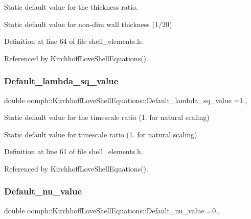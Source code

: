 Static default value for the thickness ratio. 

Static default value for non-\/dim wall thickness (1/20) 

Definition at line 64 of file shell\+\_\+elements.\+h.



Referenced by Kirchhoff\+Love\+Shell\+Equations().

\mbox{\label{classoomph_1_1KirchhoffLoveShellEquations_a62a599a88cfaa4a6b1c67eee80fb2d8b}} 
\subsubsection{\texorpdfstring{Default\+\_\+lambda\+\_\+sq\+\_\+value}{Default\_lambda\_sq\_value}}
{\footnotesize\ttfamily double oomph\+::\+Kirchhoff\+Love\+Shell\+Equations\+::\+Default\+\_\+lambda\+\_\+sq\+\_\+value =1.\hspace{0.3cm}{\ttfamily [static]}, {\ttfamily [private]}}



Static default value for the timescale ratio (1. for natural scaling) 

Static default value for timescale ratio (1. for natural scaling) 

Definition at line 61 of file shell\+\_\+elements.\+h.



Referenced by Kirchhoff\+Love\+Shell\+Equations().

\mbox{\label{classoomph_1_1KirchhoffLoveShellEquations_aaf47c41aacd7404d522737fc60ad2972}} 
\subsubsection{\texorpdfstring{Default\+\_\+nu\+\_\+value}{Default\_nu\_value}}
{\footnotesize\ttfamily double oomph\+::\+Kirchhoff\+Love\+Shell\+Equations\+::\+Default\+\_\+nu\+\_\+value =0.\hspace{0.3cm}{\ttfamily [static]}, {\ttfamily [private]}}




